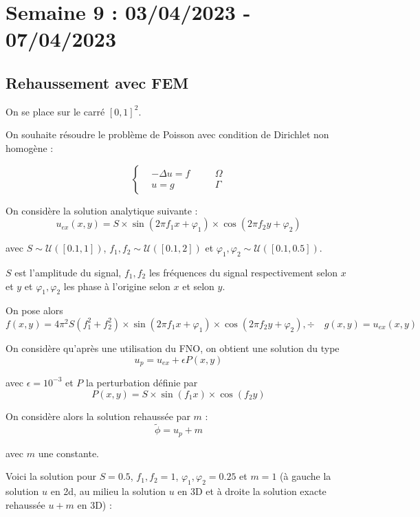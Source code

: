 \section{Semaine 9 : 03/04/2023 - 07/04/2023}
\graphicspath{{semaines/semaine_9/images/}}

\begin{abstract}
...
\end{abstract}

\subsection{Rehaussement avec FEM}

On se place sur le carré $[0,1]^2$. 

On souhaite résoudre le problème de Poisson avec condition de Dirichlet non homogène :

$$\left\{\begin{aligned}
	&-\Delta u=f \quad &&\Omega \\
	&u=g \quad &&\Gamma
\end{aligned}\right.$$

On considère la solution analytique suivante :
$$u_{ex}(x,y) = S\times\sin(2\pi f_1x + \varphi_1)\times\cos(2\pi f_2y + \varphi_2)$$ 

avec $S \sim \mathcal{U}([0.1,1])$, $f_1,f_2 \sim \mathcal{U}([0.1,2])$ et $\varphi_1,\varphi_2 \sim \mathcal{U}([0.1,0.5])$. 

$S$ est l'amplitude du signal, $f_1, f_2$ les fréquences du signal respectivement selon $x$ et $y$ et $\varphi_1, \varphi_2$ les phase à l'origine selon $x$ et selon $y$.

On pose alors
$$f(x,y)=4\pi^2 S(f_1^2+f_2^2)\times\sin(2\pi f_1x + \varphi_1)\times\cos(2\pi f_2y + \varphi_2), ÷\quad g(x,y)=u_{ex}(x,y)$$

On considère qu'après une utilisation du FNO, on obtient une solution du type
$$u_p = u_{ex}+\epsilon P(x,y)$$

avec $\epsilon=10^{-3}$ et $P$ la perturbation définie par
$$P(x,y)=S\times\sin(f_1x)\times\cos(f_2y)$$

On considère alors la solution rehaussée par $m$ :
$$\tilde{\phi}=u_p+m$$

avec $m$ une constante.

Voici la solution pour $S=0.5$, $f_1,f_2=1$, $\varphi_1,\varphi_2=0.25$ et $m=1$ (à gauche la solution $u$ en 2d, au milieu la solution $u$ en 3D et à droite la solution exacte rehaussée $u+m$ en 3D) :

